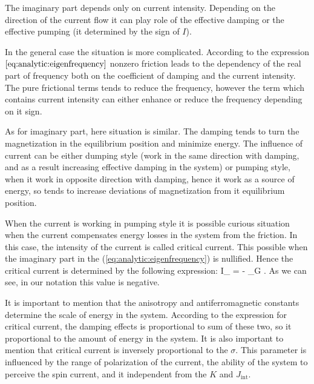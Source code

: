 The imaginary part depends only on current intensity. Depending on the direction of the current flow it can play role of the effective damping or the effective pumping (it determined by the sign of $I$).

In the general case the situation is more complicated. According to the expression $\ref{eq:analytic:eigenfrequency}$ nonzero friction leads to the dependency of the real part of frequency both on the coefficient of damping and the current intensity. The pure frictional terms tends to reduce the frequency, however the term which contains current intensity can either enhance or reduce the frequency depending on it sign.

As for imaginary part, here situation is similar. The damping tends to turn the magnetization in the equilibrium position and minimize energy. The influence of current can be either dumping style (work in the same direction with damping, and as a result increasing effective damping in the system) or pumping style, when it work in opposite direction with damping, hence it work as a source of energy, so tends to increase deviations of magnetization from it equilibrium position.

When the current is working in pumping style it is possible curious situation when the current compensates energy losses in the system from the friction. In this case, the intensity of the current is called critical current. This possible when the imaginary part in the (\ref{eq:analytic:eigenfrequency}) is nullified. Hence the critical current is determined by the following expression:
\be
\label{eq:analytic:critical_current}
	I_ = - \alpha_G .
\ee
As we can see, in our notation this value is negative.

It is important to mention that the anisotropy and antiferromagnetic constants determine the scale of energy in the system. According to the expression for critical current, the damping effects is proportional to sum of these two, so it proportional to the amount of energy in the system. It is also important to mention that critical current is inversely proportional to the $\sigma$. This parameter is influenced by the range of polarization of the current, the ability of the system to perceive the spin current, and it independent from the $K$ and $J_\text{int}$.













